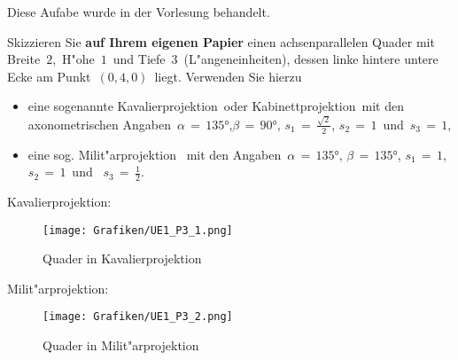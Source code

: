 \begin{Loesung}
Diese Aufabe wurde in der Vorlesung behandelt.
\end{Loesung}
\begin{Aufgabe}
Skizzieren Sie \textbf{auf Ihrem eigenen Papier} einen achsenparallelen Quader mit Breite \,$2$,\, H"ohe \,$1$\, und Tiefe \,$3$\, (L"angeneinheiten), dessen linke hintere untere Ecke am Punkt \,$(0,4,0)$\, liegt. Verwenden Sie hierzu
    \begin{itemize}
    \item eine sogenannte \glqq Kavalierprojektion\grqq\ oder \glqq Kabinettprojektion\grqq\ mit den axonometrischen Angaben \,$\alpha \,=\, \ang{135}$,\;$ \beta \,= \,\ang{90}$,  \;$s_1 \,=\, \tfrac{\sqrt{2}}{2}$, \;$s_2 \,=\, 1$\, und \,$s_3\, =\, 1$,
     \item eine sog. \glqq Milit"arprojektion \grqq\ mit den Angaben \,$\alpha\,= \,\ang{135}$, \;$\beta\,=\, \ang{135}$,\; $s_1 \,= \,1$, $s_2 \,=\, 1$\, und \, $s_3 \,=\, \tfrac{1}{2}$.
\end{itemize}
\end{Aufgabe}
\begin{Loesung}
Kavalierprojektion:
\begin{figure}[H]
	\centering
	\texttt{[image: Grafiken/UE1\_P3\_1.png]}
	\caption{Quader in Kavalierprojektion}
	\label{fig:P3_1}
\end{figure}
Milit"arprojektion:
\begin{figure}[H]
	\centering
	\texttt{[image: Grafiken/UE1\_P3\_2.png]}
	\caption{Quader in Milit"arprojektion}
	\label{fig:P3_2}
\end{figure}
\end{Loesung}